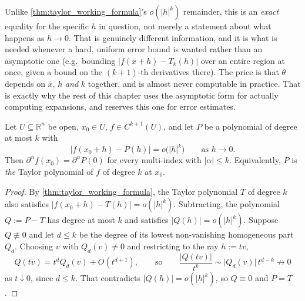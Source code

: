 \begin{remark}
Unlike \cref{thm:taylor_working_formula}'s $o(|h|^k)$ remainder, this is an \emph{exact}
equality for the specific $h$ in question, not merely a statement about what happens as
$h \to 0$. That is genuinely different information, and it is what is needed whenever a hard,
uniform error bound is wanted rather than an asymptotic one (e.g.\ bounding
$|f(\bar x+h) - T_k(h)|$ over an entire region at once, given a bound on the $(k{+}1)$-th
derivatives there). The price is that $\theta$ depends on $\bar x$, $h$ \emph{and} $k$ together,
and is almost never computable in practice. That is exactly why the rest of this chapter uses the
asymptotic form for actually computing expansions, and reserves this one for error estimates.
\end{remark}

\begin{corollary}
\label{cor:taylor_expansion_unique}
Let $U \subseteq \mathbb{R}^n$ be open, $x_0 \in U$, $f \in C^{k+1}(U)$, and let $P$ be a
polynomial of degree at most $k$ with
\[\lvert f(x_0+h) - P(h)\rvert = o\big(\lvert h\rvert^{k}\big) \qquad \text{as } h \to 0.\]
Then $\partial^\alpha f(x_0) = \partial^\alpha P(0)$ for every multi-index with
$\lvert\alpha\rvert \leq k$. Equivalently, $P$ is \emph{the} Taylor polynomial of $f$ of degree
$k$ at $x_0$.
\end{corollary}

\begin{proof}
By \cref{thm:taylor_working_formula}, the Taylor polynomial $T$ of degree $k$ also satisfies
$\lvert f(x_0+h)-T(h)\rvert = o(\lvert h\rvert^k)$. Subtracting, the polynomial $Q := P-T$ has
degree at most $k$ and satisfies $\lvert Q(h)\rvert = o(\lvert h\rvert^k)$. Suppose
$Q \not\equiv 0$ and let $d \leq k$ be the degree of its lowest non-vanishing homogeneous part
$Q_d$. Choosing $v$ with $Q_d(v) \neq 0$ and restricting to the ray $h := tv$,
\[Q(tv) = t^dQ_d(v) + O(t^{d+1}), \qquad\text{so}\qquad
  \frac{\lvert Q(tv)\rvert}{t^{k}} \sim \lvert Q_d(v)\rvert\, t^{d-k} \not\to 0\]
as $t \downarrow 0$, since $d \leq k$. That contradicts $\lvert Q(h)\rvert = o(\lvert h\rvert^k)$,
so $Q \equiv 0$ and $P = T$.
\end{proof}

